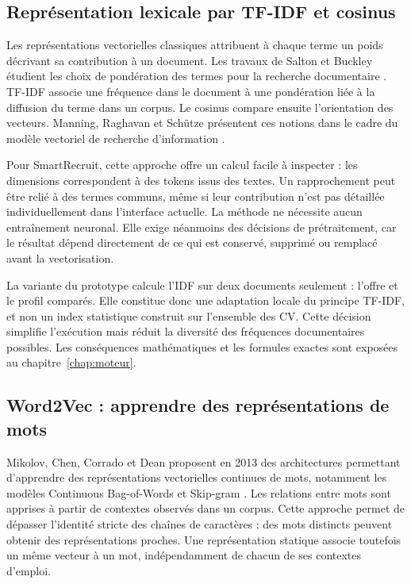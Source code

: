 \subsection{Représentation lexicale par TF-IDF et cosinus}

Les représentations vectorielles classiques attribuent à chaque terme un poids décrivant sa contribution à un document. Les travaux de Salton et Buckley étudient les choix de pondération des termes pour la recherche documentaire \cite{salton1988}. TF-IDF associe une fréquence dans le document à une pondération liée à la diffusion du terme dans un corpus. Le cosinus compare ensuite l'orientation des vecteurs. Manning, Raghavan et Schütze présentent ces notions dans le cadre du modèle vectoriel de recherche d'information \cite{manning2008}.

Pour SmartRecruit, cette approche offre un calcul facile à inspecter : les dimensions correspondent à des tokens issus des textes. Un rapprochement peut être relié à des termes communs, même si leur contribution n'est pas détaillée individuellement dans l'interface actuelle. La méthode ne nécessite aucun entraînement neuronal. Elle exige néanmoins des décisions de prétraitement, car le résultat dépend directement de ce qui est conservé, supprimé ou remplacé avant la vectorisation.

La variante du prototype calcule l'IDF sur deux documents seulement : l'offre et le profil comparés. Elle constitue donc une adaptation locale du principe TF-IDF, et non un index statistique construit sur l'ensemble des CV. Cette décision simplifie l'exécution mais réduit la diversité des fréquences documentaires possibles. Les conséquences mathématiques et les formules exactes sont exposées au chapitre~\ref{chap:moteur}.

\subsection{Word2Vec : apprendre des représentations de mots}

Mikolov, Chen, Corrado et Dean proposent en 2013 des architectures permettant d'apprendre des représentations vectorielles continues de mots, notamment les modèles Continuous Bag-of-Words et Skip-gram \cite{mikolov2013}. Les relations entre mots sont apprises à partir de contextes observés dans un corpus. Cette approche permet de dépasser l'identité stricte des chaînes de caractères : des mots distincts peuvent obtenir des représentations proches. Une représentation statique associe toutefois un même vecteur à un mot, indépendamment de chacun de ses contextes d'emploi.

